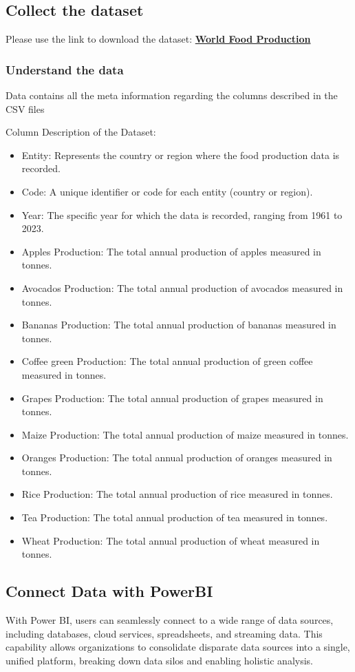 \documentclass{article}
\begin{document}
\subsection{Collect the dataset}
Please use the link to download the dataset: \textbf{\href{https://www.kaggle.com/datasets/rafsunahmad/world-food-production}{World Food Production}}


\subsubsection{Understand the data}
Data contains all the meta information regarding the columns described in the CSV files

Column Description of the Dataset:
\begin{itemize}
    \item Entity: Represents the country or region where the food production data is recorded.
    \item Code: A unique identifier or code for each entity (country or region).
    \item Year: The specific year for which the data is recorded, ranging from 1961 to 2023.
    \item Apples Production: The total annual production of apples measured in tonnes.
    \item Avocados Production: The total annual production of avocados measured in tonnes.
    \item Bananas Production: The total annual production of bananas measured in tonnes.
    \item Coffee green Production: The total annual production of green coffee measured in tonnes.
    \item Grapes Production: The total annual production of grapes measured in tonnes.
    \item Maize Production: The total annual production of maize measured in tonnes.
    \item Oranges Production: The total annual production of oranges measured in tonnes.
    \item Rice Production: The total annual production of rice measured in tonnes.
    \item Tea Production: The total annual production of tea measured in tonnes.
    \item Wheat Production: The total annual production of wheat measured in tonnes.
\end{itemize}

\subsection{Connect Data with PowerBI}
With Power BI, users can seamlessly connect to a wide range of data sources, including databases, cloud services, spreadsheets, and streaming data. This capability allows organizations to consolidate disparate data sources into a single, unified platform, breaking down data silos and enabling holistic analysis.
\end{document}
